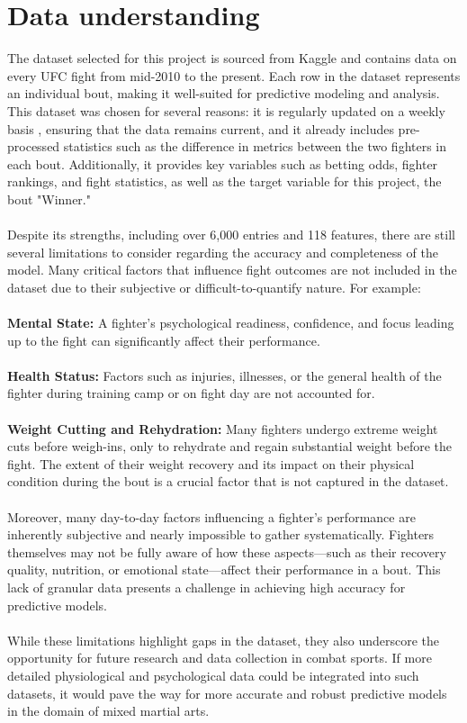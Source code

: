 \documentclass{article}
\begin{document}
\section{Data understanding}
	The dataset selected for this project is sourced from Kaggle and contains data on every UFC fight from mid-2010 to the present. Each row in the dataset represents 
  an individual bout, making it well-suited for predictive modeling and analysis. This dataset was chosen for several reasons: it is regularly updated on a weekly basis
  , ensuring that the data remains current, and it already includes pre-processed statistics such as the difference in metrics between the two fighters in each bout. 
  Additionally, it provides key variables such as betting odds, fighter rankings, and fight statistics, as well as the target variable for this project, the bout
  "Winner." \\\\
  Despite its strengths, including over 6,000 entries and 118 features, there are still several limitations to consider regarding the accuracy and completeness of
  the model. Many critical factors that influence fight outcomes are not included in the dataset due to their subjective or difficult-to-quantify nature. 
  For example:\\\\
  \textbf{Mental State: }A fighter's psychological readiness, confidence, and focus leading up to the fight can significantly affect their performance. \\\\
  \textbf{Health Status: } Factors such as injuries, illnesses, or the general health of the fighter during training camp or on fight day are not accounted for.\\\\
  \textbf{Weight Cutting and Rehydration: } Many fighters undergo extreme weight cuts before weigh-ins, only to rehydrate and regain substantial weight before the fight. 
  The extent of their weight recovery and its impact on their physical condition during the bout is a crucial factor that is not captured in the dataset.\\\\
  Moreover, many day-to-day factors influencing a fighter's performance are inherently subjective and nearly impossible to gather systematically. Fighters
  themselves may not be fully aware of how these aspects—such as their recovery quality, nutrition, or emotional state—affect their performance in a bout.
  This lack of granular data presents a challenge in achieving high accuracy for predictive models.\\\\
  While these limitations highlight gaps in the dataset, they also underscore the opportunity for future research and data collection in combat sports. 
  If more detailed physiological and psychological data could be integrated into such datasets, it would pave the way for more accurate and robust predictive models
  in the domain of mixed martial arts.\\\\
\end{document}
